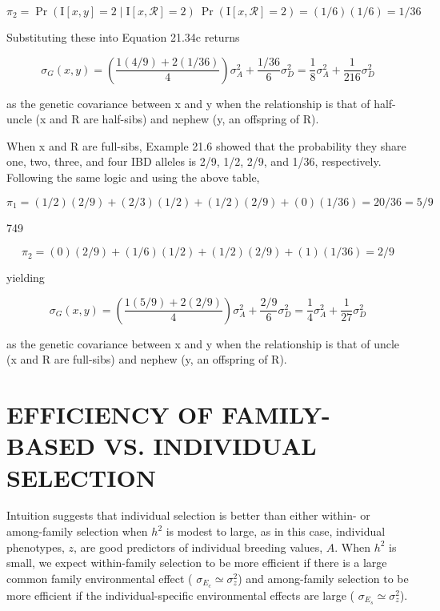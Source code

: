 \documentclass{article}
\begin{document}
\begin{equation}
\pi_{2}=\Pr(\mathrm{I}[x,y]=2\mid\mathrm{I}[x,\mathcal{R}]=2)\ \Pr(\mathrm{I}[x,\mathcal{R}]=2)=(1/6)(1/6)=1/36
\end{equation}

Substituting these into Equation 21.34c returns

\begin{equation}
\sigma_{G}(x,y)=\left(\frac{1(4/9)+2(1/36)}{4}\right)\sigma_{A}^{2}+\frac{1/36}{6}\sigma_{D}^{2}=\frac{1}{8}\sigma_{A}^{2}+\frac{1}{216}\sigma_{D}^{2}
\tag{21.34d}
\label{eq:21_34d}
\end{equation}

as the genetic covariance between x and y when the relationship is that of half-uncle (x and R are half-sibs) and nephew (y, an offspring of R).

When x and R are full-sibs, Example 21.6 showed that the probability they share one, two, three, and four IBD alleles is 2/9, 1/2, 2/9, and 1/36, respectively. Following the same logic and using the above table,

\begin{equation}
\pi_{1}=(1/2)(2/9)+(2/3)(1/2)+(1/2)(2/9)+(0)(1/36)=20/36=5/9
\end{equation}

749

\begin{equation}
\pi_{2}=(0)(2/9)+(1/6)(1/2)+(1/2)(2/9)+(1)(1/36)=2/9
\end{equation}

yielding

\begin{equation}
\sigma_{G}(x,y)=\left(\frac{1(5/9)+2(2/9)}{4}\right)\sigma_{A}^{2}+\frac{2/9}{6}\sigma_{D}^{2}=\frac{1}{4}\sigma_{A}^{2}+\frac{1}{27}\sigma_{D}^{2}
\tag{21.34e}
\label{eq:21_34e}
\end{equation}

as the genetic covariance between x and y when the relationship is that of uncle (x and R are full-sibs) and nephew (y, an offspring of R).

\section{EFFICIENCY OF FAMILY-BASED VS. INDIVIDUAL SELECTION}
Intuition suggests that individual selection is better than either within- or among-family selection when  $ h^2 $ is modest to large, as in this case, individual phenotypes,  $ z $, are good predictors of individual breeding values,  $ A $. When  $ h^2 $ is small, we expect within-family selection to be more efficient if there is a large common family environmental effect ( $ \sigma_{E_c} \simeq \sigma_z^2 $) and among-family selection to be more efficient if the individual-specific environmental effects are large ( $ \sigma_{E_s} \simeq \sigma_z^2 $).
\end{document}
